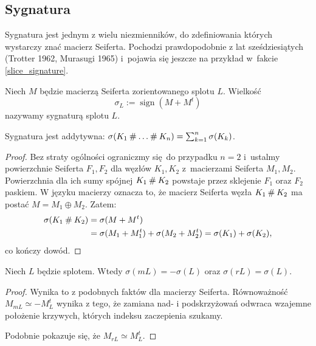 \subsection{Sygnatura} %
\label{sub:signature}
Sygnatura jest jednym z wielu niezmienników, do zdefiniowania których wystarczy znać macierz Seiferta.
Pochodzi prawdopodobnie z lat sześdziesiątych (Trotter 1962, Murasugi 1965) i~pojawia się jeszcze na przykład w~fakcie \ref{slice_signature}.

\begin{definition}[sygnatura]
    Niech $M$ będzie macierzą Seiferta zorientowanego splotu $L$.
    Wielkość
    \begin{equation}
        \sigma_L := \operatorname{sign} (M + M^t)
    \end{equation}
    nazywamy sygnaturą splotu $L$.
\end{definition}

\begin{proposition} \label{prop_sigma_additive}
    Sygnatura jest addytywna: $\sigma(K_1 \mathbin{\#} \ldots \mathbin{\#} K_n) = \sum_{k=1}^n \sigma(K_k)$.
\end{proposition}

\begin{proof}
    Bez straty ogólności ograniczmy się do przypadku $n = 2$ i~ustalmy powierzchnie Seiferta $F_1, F_2$ dla węzłów $K_1, K_2$ z~macierzami Seiferta $M_1, M_2$.
    Powierzchnia dla ich sumy spójnej $K_1 \mathbin{\#} K_2$ powstaje przez sklejenie $F_1$ oraz $F_2$ paskiem.
    W języku macierzy oznacza to, że macierz Seiferta węzła $K_1 \mathbin{\#} K_2$ ma postać $M = M_1 \oplus M_2$.
    Zatem:
    \begin{align}
        \sigma(K_1 \mathbin{\#} K_2) & = \sigma(M + M^t) \\
                               & = \sigma(M_1 + M_1^t) + \sigma(M_2 + M_2^t) = \sigma(K_1) + \sigma(K_2),
    \end{align}
    co kończy dowód.
\end{proof}

\begin{proposition} \label{prop_sigma_inverse}
    Niech $L$ będzie splotem.
    Wtedy $\sigma(mL) = -\sigma(L)$ oraz $\sigma(rL) = \sigma(L)$.
\end{proposition}

\begin{proof}
    Wynika to z podobnych faktów dla macierzy Seiferta.
    Równoważność $M_{mL} \simeq - M_L^t$ wynika z tego, że zamiana nad- i podskrzyżowań odwraca wzajemne położenie krzywych, których indeksu zaczepienia szukamy.

    Podobnie pokazuje się, że $M_{rL} \simeq M_L^t$.
\end{proof}

